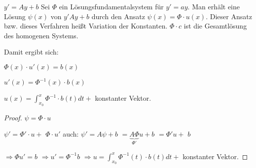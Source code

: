 \begin{satz}
$y' = Ay+b$ Sei $\Phi$ ein Lösungsfundamentalsystem für $y' = ay$. Man erhält eine Lösung $\psi(x)$
von $y'Ay + b$ durch den Ansatz $ \psi (x) = \Phi \cdot u(x)$. Dieser Ansatz bzw. dieses Verfahren heißt Variation der Konstanten. $\Phi \cdot c$ ist die Gesamtlösung des homogenen Systems. 

Damit ergibt sich: 

$\Phi(x) \cdot u'(x) = b(x)$

$u'(x) = \Phi^{-1}(x) \cdot b(x)$

$u(x) = \int_{x_0}^{x} \Phi^{-1} \cdot b(t) dt + $ konstanter Vektor.
\end{satz}

\begin{proof}
$\psi = \Phi \cdot u$

$\psi' = \Phi' \cdot u + $
\color{red}
\underline{$\Phi \cdot u'$}
\color{black}
auch: $\psi' = A\psi + b $
$=\underbrace{A \Phi}_{\Phi'} u + b$
$=\Phi' u + $
\color{red}
\underline{$b$}
\color{black}

$\Rightarrow \Phi u' = b$
$\Rightarrow u' = \Phi^{-1} b$
$\Rightarrow u = \int_{x_0}^{x} \Phi^{-1} (t) \cdot b(t) dt + $ konstanter Vektor. 
\end{proof}